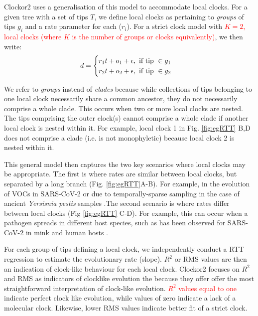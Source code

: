 \documentclass{article}
\begin{document}
Clockor2 uses a generalisation of this model to accommodate local clocks. For a given tree with a set of tips $T$, we define local clocks as pertaining to \textit{groups} of tips $g_i$ and a rate parameter for each ($r_i$). For a strict clock model with \textcolor{red}{$K=2$, local clocks (where $K$ is the number of groups or clocks equivalently)}, we then write:
\begin{equation*}
    d = 
    \begin{cases}
    r_{1}t + o_{1} + \epsilon, \textnormal{ if tip }\in g_1\\
    r_{2}t + o_{2} + \epsilon, \textnormal{ if tip }\in g_2
    
    \end{cases}
\end{equation*}

We refer to \emph{groups} instead of \emph{clades} because while collections of tips belonging to one local clock necessarily share a common ancestor, they do not necessarily comprise a whole clade. This occurs when two or more local clocks are nested. The tips comprising the outer clock(s) cannot comprise a whole clade if another local clock is nested within it. For example, local clock 1 in Fig. \ref{fig:egRTT} B,D does not comprise a clade (i.e. is not monophyletic) because local clock 2 is nested within it.

This general model then captures the two key scenarios where local clocks may be appropriate. The first is where rates are similar between local clocks, but separated by a long branch (Fig. \ref{fig:egRTT}A-B). For example, in the evolution of VOCs in SARS-CoV-2 or due to temporally-sparse sampling in the case of ancient \textit{Yersisnia pestis} samples \citep{tay2022emergence, eaton2023plagued,hill_origins_2022}.The second scenario is where rates differ between local clocks (Fig \ref{fig:egRTT} C-D). For example, this can occur when a pathogen spreads in different host species, such as has been observed for SARS-CoV-2 in mink and human hosts \citep{porter2023evolutionary}.

For each group of tips defining a local clock, we independently conduct a RTT regression to estimate the evolutionary rate (slope). $R^2$ or RMS values are then an indication of clock-like behaviour for each local clock. Clockor2 focuses on $R^2$ and RMS as indicators of clocklike evolution the because they offer offer the most straightforward interpretation of clock-like evolution. \textcolor{red}{$R^2$ values equal to one} indicate perfect clock like evolution, while values of zero indicate a lack of a molecular clock. Likewise, lower RMS values indicate better fit of a strict clock.
\end{document}

